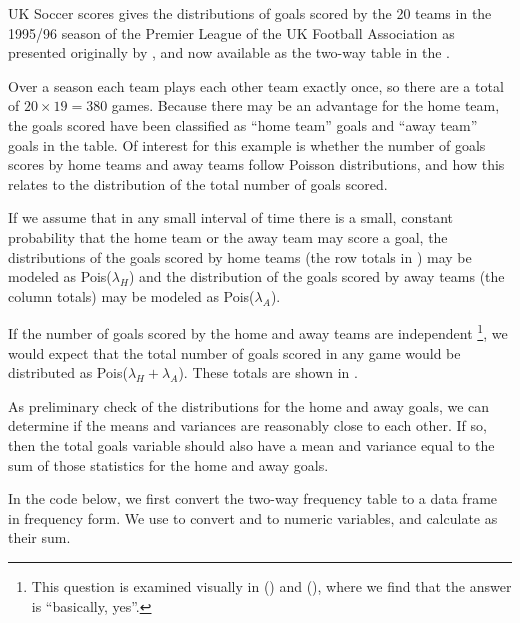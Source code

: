 \documentclass[11pt]{book}
\renewenvironment{knitrout}{\small\renewcommand{\baselinestretch}{.85}}{} %
\begin{document}
\begin{Example}[soccer]{UK Soccer scores}
  gives the distributions of goals scored by
the 20 teams in the  1995/96 season of the
 Premier League of the UK Football Association
as presented originally by 
\citet{Lee:97}, and now available as the two-way table 
in the .

Over a season
each team plays each other team exactly once, so there are a total of
$20 \times 19 = 380$ games.
Because there may be an advantage for the home team,
the goals scored have been classified as ``home team'' goals
and ``away team'' goals in the table. Of interest for this example is whether
the number of goals scores by home teams and away teams follow
Poisson distributions, and how this relates to the distribution of the 
total number of goals scored.

If we assume that in any small interval of time there is a small, constant
probability that the home team or the away team may score a goal,
the distributions of the goals scored by home teams
(the row totals in )
may be modeled as Pois($\lambda_H$) and the distribution of
the goals scored by away teams (the column totals)
may be modeled as Pois($\lambda_A$).

If the number of goals scored by the home and away teams are independent%
\footnote{This question
is examined visually in  ()
and  (), where we find that the answer
is ``basically, yes''.},
we would expect that the total number of goals scored in any
game would be distributed as Pois($\lambda_H + \lambda_A$).
These totals are shown in .


As preliminary check of the distributions for the home and away goals,
we can determine if the means and variances are reasonably close
to each other.
If so, then the total goals variable should also have a mean and variance
equal to the sum of those statistics for the home and away goals.

In the \R code below, we first convert the two-way frequency table
 to a data frame in frequency form.
We use  to convert  and  to
numeric variables, and calculate  as their sum.

\begin{knitrout}
\color{fgcolor}\begin{kframe}
\begin{alltt}
 \hlstd{=}\hlstd{)}


\end{alltt}
\end{kframe}
\end{knitrout}
\end{Example}
\end{document}
